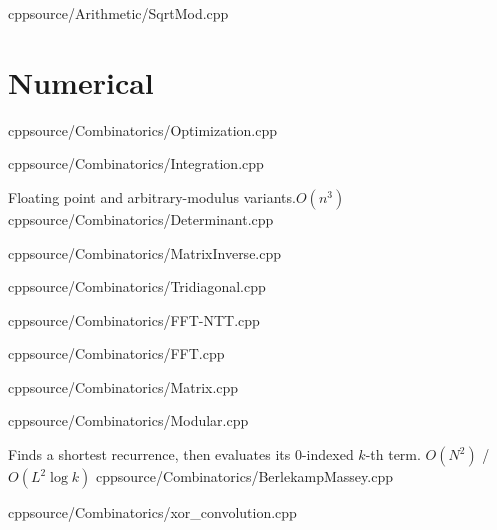 \documentclass[portrait, 8pt, a4paper, oneside, twocolumn]{extarticle}
\begin{document}



{}{}
{cpp}{source/Arithmetic/SqrtMod.cpp}















\section{Numerical}


{cpp}{source/Combinatorics/Optimization.cpp}

{cpp}{source/Combinatorics/Integration.cpp}


{Floating point and arbitrary-modulus variants.}{$O(n^3)$}
{cpp}{source/Combinatorics/Determinant.cpp}


{cpp}{source/Combinatorics/MatrixInverse.cpp}

{cpp}{source/Combinatorics/Tridiagonal.cpp}

{}{}
{cpp}{source/Combinatorics/FFT-NTT.cpp}

{}{}
{cpp}{source/Combinatorics/FFT.cpp}

{}{}
{cpp}{source/Combinatorics/Matrix.cpp}

{}{}
{cpp}{source/Combinatorics/Modular.cpp}

{Finds a shortest recurrence, then evaluates its $0$-indexed $k$-th term.}
{$O(N^2)$ / $O(L^2\log k)$}
{cpp}{source/Combinatorics/BerlekampMassey.cpp}



{}{}
{cpp}{source/Combinatorics/xor_convolution.cpp}
\end{document}
